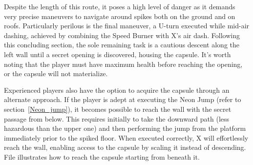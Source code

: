 Despite the length of this route, it poses a high level of danger as it  demands very precise maneuvers to navigate around spikes both on the ground and on roofs. Particularly perilous is the final maneuver, a U-turn executed while mid-air dashing, achieved by combining the Speed Burner with X's air dash. Following this concluding section, the sole remaining task is a cautious descent along the left wall until a secret opening is discovered, housing the capsule. It's worth noting that the player must have maximum health before reaching the opening, or the capsule will not materialize.

Experienced players also have the option to acquire the capsule through an alternate approach. If the player is adept at executing the Neon Jump (refer to section~\ref{Neon_jump}), it becomes possible to reach the wall with the secret passage from below. This requires initially to take the downward path (less hazardous than the upper one) and then performing the jump from the platform immediately prior to the spiked floor. When executed correctly, X will effortlessly reach the wall, enabling access to the capsule by scaling it instead of descending. File  illustrates how to reach the capsule starting from beneath it.

